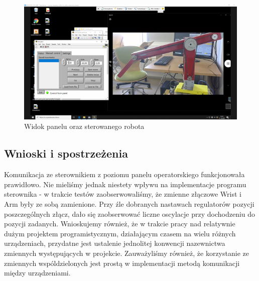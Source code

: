 \documentclass[margin = 2cm]{article}
\begin{document}
\begin{figure}[H]
	\centering
	\includegraphics[width=.9\textwidth]{widok}
	\caption{Widok panelu oraz sterowanego robota}
\end{figure}

\subsection{Wnioski i spostrzeżenia}
Komunikacja ze sterownikiem z poziomu panelu operatorskiego funkcjonowała prawidłowo. Nie mieliśmy jednak niestety wpływu na implementacje programu sterownika - w trakcie testów zaobserwowaliśmy, że zmienne złączowe Wrist i Arm były ze sobą zamienione. Przy źle dobranych nastawach regulatorów pozycji poszczególnych złącz, dało się zaobserwować liczne oscylacje przy dochodzeniu do pozycji zadanych. Wnioskujemy również, że w trakcie pracy nad relatywnie dużym projektem programistycznym, działającym  czasem na wielu różnych urządzeniach, przydatne jest ustalenie jednolitej konwencji nazewnictwa zmiennych występujących w projekcie. Zauważyliśmy również, że korzystanie ze zmiennych wspóldzielonych jest prostą w implementacji metodą komunikacji między urządzeniami.
\end{document}
